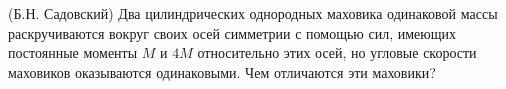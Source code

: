 (Б.Н. Садовский)
Два цилиндрических однородных маховика одинаковой массы раскручиваются
вокруг своих осей симметрии с помощью сил, имеющих постоянные моменты
$M$ и $4M$ относительно этих осей, но угловые скорости маховиков
оказываются одинаковыми. Чем отличаются эти маховики?
